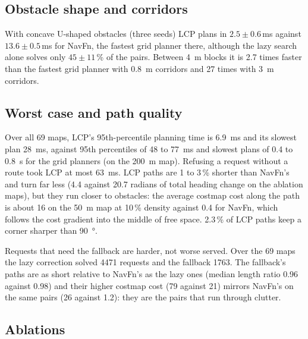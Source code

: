 \documentclass[conference]{IEEEtran}
\newcommand{\lcp}{LCP}
\begin{document}
\subsection{Obstacle shape and corridors}

With concave U-shaped obstacles (three seeds) \lcp{} plans in
$2.5 \pm 0.6$\,ms against $13.6 \pm 0.5$\,ms for NavFn, the fastest grid planner
there, although the lazy search alone solves only $45 \pm 11$\,\% of the pairs. Between \SI{4}{m} blocks it is 2.7 times faster than the fastest
grid planner with \SI{0.8}{m} corridors and 27 times with \SI{3}{m} corridors.

\subsection{Worst case and path quality}
\label{sec:quality}

Over all 69 maps, \lcp{}'s 95th-percentile planning time is \SI{6.9}{ms} and its
slowest plan \SI{28}{ms}, against 95th percentiles of 48 to \SI{77}{ms} and
slowest plans of 0.4 to \SI{0.8}{s} for the grid planners (on the \SI{200}{m}
map). Refusing a request without a route took \lcp{} at most \SI{63}{ms}.
\lcp{} paths are 1 to 3\,\% shorter than
NavFn's and turn far less (4.4 against 20.7 radians of total heading change on the
ablation maps), but they run closer to obstacles: the average costmap cost along
the path is about 16 on the \SI{50}{m} map at 10\,\% density against 0.4 for
NavFn, which follows the cost gradient into the middle of free space. 2.3\,\% of
\lcp{} paths keep a corner sharper than \SI{90}{\degree}.

Requests that need the fallback are harder, not worse served. Over the 69 maps
the lazy correction solved \num{4471} requests and the fallback \num{1763}. The fallback's
paths are as short relative to NavFn's as the lazy ones (median length ratio 0.96
against 0.98) and their higher costmap cost (79 against 21) mirrors NavFn's on the
same pairs (26 against 1.2): they are the pairs that run through clutter.

\subsection{Ablations}
\label{sec:ablations}
\end{document}
